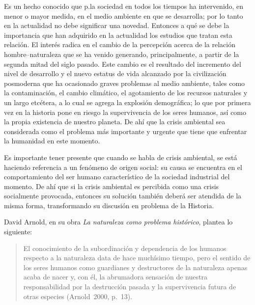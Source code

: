Es un hecho conocido que p.la sociedad en todos los tiempos ha 
intervenido, en menor o mayor medida, en el medio ambiente en que se 
desarrolla; por lo tanto en la actualidad no debe significar una 
novedad. Entonces a qué se debe la importancia que han adquirido en la 
actualidad los estudios que tratan esta relación. El interés radica en 
el cambio de la percepción acerca de la relación hombre--naturaleza que 
se ha venido generando, principalmente, a partir de la segunda mitad 
del siglo pasado. Este cambio es el resultado del incremento del nivel 
de desarrollo y el nuevo estatus de vida alcanzado por la civilización 
posmoderna que ha ocasionado graves problemas al medio ambiente, tales 
como la contaminación, el cambio climático, el agotamiento de los 
recursos naturales y un largo etcétera, a lo cual se agrega la 
explosión demográfica; lo que por primera vez en la historia pone en 
riesgo la supervivencia de los seres humanos, así como la propia 
existencia de nuestro planeta. De ahí que la crisis ambiental sea 
considerada como el problema más importante y urgente  que tiene que 
enfrentar la humanidad en este momento.

Es importante tener presente que cuando se habla de crisis ambiental, 
se está haciendo referencia a un fenómeno de origen social: su causa se 
encuentra en el comportamiento del ser humano característico de la 
sociedad industrial del momento. De ahí que si la crisis ambiental es 
percibida como una crisis socialmente provocada, entonces su solución 
también deberá ser atendida de la misma forma, transformando su 
discusión en problema de la Historia. 

David Arnold, en su obra \textit{La naturaleza como problema histórico}, plantea lo siguiente:

\begin{quotation} 
El conocimiento de la subordinación y dependencia de los 
humanos respecto a la naturaleza data de hace muchísimo tiempo, pero el 
sentido de los seres humanos como guardianes y destructores de la 
naturaleza apenas acaba de nacer y, con él, la abrumadora sensación de 
nuestra responsabilidad por la destrucción pasada y la supervivencia 
futura de otras especies (Arnold~2000, p.~13).
\end{quotation}   

